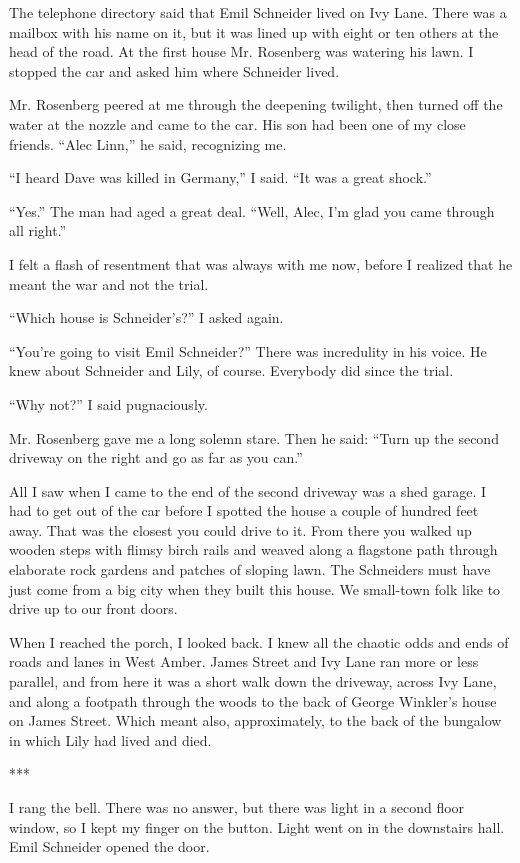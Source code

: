 \documentclass{novel}
\begin{document}
The telephone directory said that Emil Schneider lived on Ivy Lane. There was a mailbox with his name on it, but it was lined up with eight or ten others at the head of the road. At the first house Mr. Rosenberg was watering his lawn. I stopped the car and asked him where Schneider lived.

Mr. Rosenberg peered at me through the deepening twilight, then turned off the water at the nozzle and came to the car. His son had been one of my close friends. “Alec Linn,” he said, recognizing me.

“I heard Dave was killed in Germany,” I said. “It was a great shock.”

“Yes.” The man had aged a great deal. “Well, Alec, I’m glad you came through all right.”

I felt a flash of resentment that was always with me now, before I realized that he meant the war and not the trial.

“Which house is Schneider’s?” I asked again.

“You’re going to visit Emil Schneider?” There was incredulity in his voice. He knew about Schneider and Lily, of course. Everybody did since the trial.

“Why not?” I said pugnaciously.

Mr. Rosenberg gave me a long solemn stare. Then he said: “Turn up the second driveway on the right and go as far as you can.”

All I saw when I came to the end of the second driveway was a shed garage. I had to get out of the car before I spotted the house a couple of hundred feet away. That was the closest you could drive to it. From there you walked up wooden steps with flimsy birch rails and weaved along a flagstone path through elaborate rock gardens and patches of sloping lawn. The Schneiders must have just come from a big city when they built this house. We small-town folk like to drive up to our front doors.

When I reached the porch, I looked back. I knew all the chaotic odds and ends of roads and lanes in West Amber. James Street and Ivy Lane ran more or less parallel, and from here it was a short walk down the driveway, across Ivy Lane, and along a footpath through the woods to the back of George Winkler’s house on James Street. Which meant also, approximately, to the back of the bungalow in which Lily had lived and died.

***

I rang the bell. There was no answer, but there was light in a second floor window, so I kept my finger on the button. Light went on in the downstairs hall. Emil Schneider opened the door.
\end{document}
